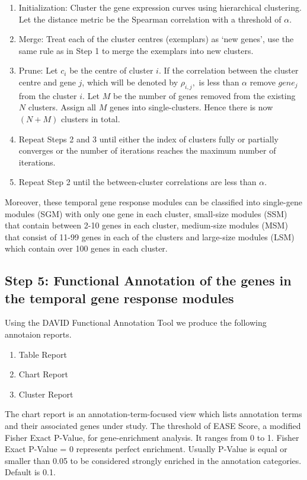 \begin{enumerate}
   \item Initialization: Cluster the gene expression curves using hierarchical clustering. Let the distance metric be the Spearman correlation with a threshold of $\alpha$.
   \item Merge: Treat each of the cluster centres (exemplars) as `new genes', use the same rule as in Step 1 to merge the exemplars into new clusters.
   \item Prune: Let $c_{i}$ be the centre of cluster $i$. If the correlation between the cluster centre and gene $j$, which will be denoted by $\rho_{i,j},$ is less than $\alpha$ remove $gene_{j}$ from the cluster $i$. Let $M$ be the number of genes removed from the existing $N$ clusters. Assign all $M$ genes into single-clusters. Hence there is now $(N+M)$ clusters in total.
   \item Repeat Steps 2 and 3 until either the index of clusters fully or partially converges or the number of iterations reaches the maximum number of iterations.
   \item Repeat Step 2 until the between-cluster correlations are less than $\alpha$.
\end{enumerate}

Moreover, these temporal gene response modules can be classified into single-gene modules (SGM) with only one gene in each cluster, small-size modules (SSM) that contain between 2-10 genes in each cluster, medium-size modules (MSM) that consist of 11-99 genes in each of the clusters and large-size modules (LSM) which contain over 100 genes in each cluster.



\subsection*{Step 5: Functional Annotation of the genes in the temporal gene response modules}

Using the DAVID Functional Annotation Tool \cite{huang2009systematic,huang2009bioinformatics} we produce the following annotaion reports.

\begin{enumerate}
\setlength{\itemsep}{-1ex}
   \item Table Report
   \item Chart Report
   \item Cluster Report
\end{enumerate}

The chart report is an annotation-term-focused view which lists annotation terms and their associated genes under study. The threshold of EASE Score, a modified Fisher Exact P-Value, for gene-enrichment analysis. It ranges from 0 to 1. Fisher Exact P-Value = 0 represents perfect enrichment. Usually P-Value is equal or smaller than 0.05 to be considered strongly enriched in the annotation categories. Default is 0.1.

